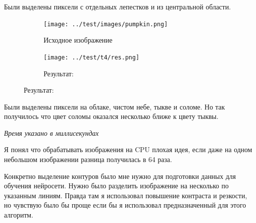 \documentclass[12pt]{article}
\begin{document}
Были выделены пиксели с отдельных лепестков и из центральной области.

\begin{figure}[tbh]
	\caption*{Большое изображение: 6000x4000}
	\begin{subfigure}{0.49\textwidth}
		\centering
		\caption*{Исходное изображение}
		\texttt{[image: ../test/images/pumpkin.png]}
	\end{subfigure}
	\begin{subfigure}{0.49\textwidth}
		\centering
		\caption*{Результат:}
		\texttt{[image: ../test/t4/res.png]}
	\end{subfigure}
\end{figure}

Были выделены пиксели на облаке, чистом небе, тыкве и соломе.
Но так получилось что цвет соломы оказался несколько ближе к цвету тыквы.

\textit{Время указано в миллисекундах}





Я понял что обрабатывать изображения на CPU плохая идея, если даже на одном небольшом изображении
разница получилась в 64 раза.

Конкретно выделение контуров было мне нужно для подготовки данных для обучения нейросети.
Нужно было разделить изображение на несколько по указанным линиям.
Правда там я использовал повышение контраста и резкости,
но чувствую было бы проще если бы я использовал предназначенный для этого алгоритм.
\end{document}
